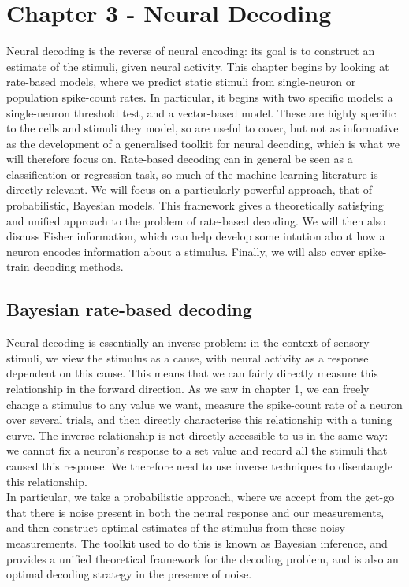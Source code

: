 \documentclass{article}
\begin{document}
\section{Chapter 3 - Neural Decoding}

Neural decoding is the reverse of neural encoding: its goal is to construct an estimate of the stimuli, given neural activity. This chapter begins by looking at rate-based models, where we predict static stimuli from single-neuron or population spike-count rates. In particular, it begins with two specific models: a single-neuron threshold test, and a vector-based model. These are highly specific to the cells and stimuli they model, so are useful to cover, but not as informative as the development of a generalised toolkit for neural decoding, which is what we will therefore focus on. Rate-based decoding can in general be seen as a classification or regression task, so much of the machine learning literature is directly relevant. We will focus on a particularly powerful approach, that of probabilistic, Bayesian models. This framework gives a theoretically satisfying and unified approach to the problem of rate-based decoding. We will then also discuss Fisher information, which can help develop some intution about how a neuron encodes information about a stimulus. Finally, we will also cover spike-train decoding methods.

\subsection{Bayesian rate-based decoding}

Neural decoding is essentially an inverse problem: in the context of sensory stimuli, we view the stimulus as a cause, with neural activity as a response dependent on this cause. This means that we can fairly directly measure this relationship in the forward direction. As we saw in chapter 1, we can freely change a stimulus to any value we want, measure the spike-count rate of a neuron over several trials, and then directly characterise this relationship with a tuning curve. The inverse relationship is not directly accessible to us in the same way: we cannot fix a neuron's response to a set value and record all the stimuli that caused this response. We therefore need to use inverse techniques to disentangle this relationship.\\

In particular, we take a probabilistic approach, where we accept from the get-go that there is noise present in both the neural response and our measurements, and then construct optimal estimates of the stimulus from these noisy measurements. The toolkit used to do this is known as Bayesian inference, and provides a unified theoretical framework for the decoding problem, and is also an optimal decoding strategy in the presence of noise.\\
\end{document}
